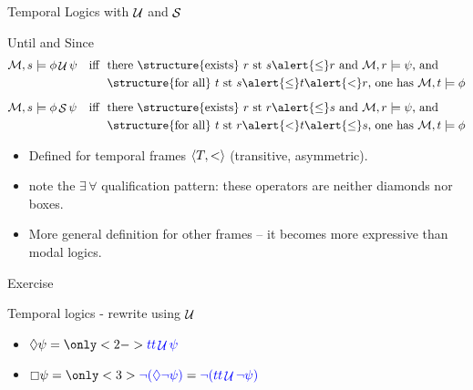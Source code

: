\documentclass[aspectratio=169]{beamer}
\begin{document}
\begin{frame}{Temporal Logics with $\mathop{\mathcal{U}}$ and $\mathop{\mathcal{S}}$}
\begin{block}{Until and Since}
  \begin{align*}
    \ger{M},s & \models \phi\Until\psi
      & \text{iff}~~& \text{there \structure{exists} $r$ st
                      $s\alert{\leq}r$ and $\ger{M},r \models \psi$, and} \\
      && & \text{\structure{for all} $t$ st $s \alert{\leq} t \alert{<} r$,
                 one has $\ger{M},t \models \phi$}
    \\[2mm]
    \ger{M},s & \models \phi\Since\psi
      & \text{iff}~~& \text{there \structure{exists} $r$ st
                      $r\alert{\leq}s$ and $\ger{M},r \models \psi$, and} \\
      && & \text{\structure{for all} $t$ st $r \alert{<} t \alert{\leq} s$,
                 one has $\ger{M},t \models \phi$}
  \end{align*}
\end{block}
%
\begin{itemize}
\item Defined for temporal frames $\langle T,< \rangle$ (transitive, asymmetric).
\item note the $\exists\, \forall$ qualification pattern: these operators are neither diamonds nor boxes.
\item  More general definition for other frames -- it becomes more expressive than modal logics.
\end{itemize}
\end{frame}

\begin{frame}{Exercise}
\begin{exampleblock}{Temporal logics - rewrite using $\mathop{\mathcal{U}}$}
\begin{itemize}
  \item $\eventual \psi = \only<2->{\blue{tt \Until \psi}}$
  \item $\always \psi = \only<3>{\blue{\lnot(\eventual \lnot \psi)} = \blue{
                        \lnot(tt \Until \lnot\psi)}}$
\end{itemize}
\end{exampleblock}
  
\end{frame}
\end{document}
